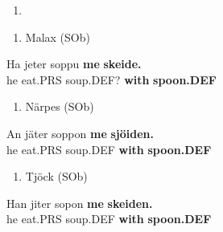 \begin{enumerate} %
\item 
\end{enumerate} %
\setcounter{listLFOxcviiileveli}{0}
\begin{enumerate} %
\item 
Malax (SOb)

\end{enumerate} %
\ea\label{}
\gll Ha  jeter  soppu  \textbf{me}\textbf{  skeide.}\\


he  eat.PRS  soup.DEF?  \textbf{with} \textbf{spoon.DEF}\\ %


\begin{enumerate} %
\item 
Närpes (SOb)

\end{enumerate} %
\ea\label{}
\gll An  jäter  soppon  \textbf{me}\textbf{  sjöiden.}\\


he  eat.PRS  soup.DEF  \textbf{with} \textbf{spoon.DEF}\\ %


\begin{enumerate} %
\item 
Tjöck (SOb)

\end{enumerate} %
\ea\label{}
\gll Han  jiter  sopon  \textbf{me} \textbf{skeiden.}\\


he  eat.PRS  soup.DEF  \textbf{with} \textbf{spoon.DEF}\\ %


